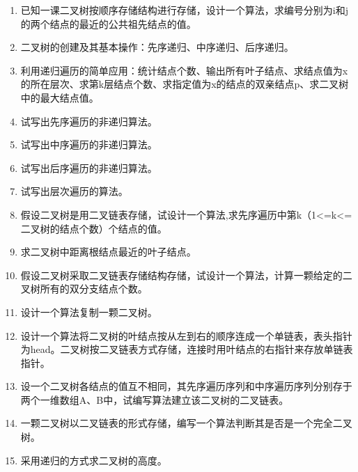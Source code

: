 \documentclass[lang=cn,newtx,10pt,scheme=chinese]{../../elegantbook}
\begin{document}
\begin{enumerate}
\def\labelenumi{\arabic{enumi}.}
\item
  已知一课二叉树按顺序存储结构进行存储，设计一个算法，求编号分别为i和j的两个结点的最近的公共祖先结点的值。
\vspace{5cm}
\item
  二叉树的创建及其基本操作：先序递归、中序递归、后序递归。
\vspace{5cm}
\item
  利用递归遍历的简单应用：统计结点个数、输出所有叶子结点、求结点值为x的所在层次、求第k层结点个数、求指定值为x的结点的双亲结点p、求二叉树中的最大结点值。
\vspace{5cm}
\item
  试写出先序遍历的非递归算法。
\vspace{5cm}
\item
  试写出中序遍历的非递归算法。
\vspace{5cm}
\item
  试写出后序遍历的非递归算法。
\vspace{5cm}
\item
  试写出层次遍历的算法。
\vspace{5cm}
\item
  假设二叉树是用二叉链表存储，试设计一个算法,求先序遍历中第k（1\textless=k\textless=二叉树的结点个数）个结点的值。
\vspace{5cm}
\item
  求二叉树中距离根结点最近的叶子结点。
\vspace{5cm}
\item
  假设二叉树采取二叉链表存储结构存储，试设计一个算法，计算一颗给定的二叉树所有的双分支结点个数。
\vspace{5cm}
\item
  设计一个算法复制一颗二叉树。
\vspace{5cm}
\item
  设计一个算法将二叉树的叶结点按从左到右的顺序连成一个单链表，表头指针为head。二叉树按二叉链表方式存储，连接时用叶结点的右指针来存放单链表指针。
\vspace{5cm}
\item
  设一个二叉树各结点的值互不相同，其先序遍历序列和中序遍历序列分别存于两个一维数组A、B中，试编写算法建立该二叉树的二叉链表。
\vspace{5cm}
\item
  一颗二叉树以二叉链表的形式存储，编写一个算法判断其是否是一个完全二叉树。
\vspace{5cm}
\item
  采用递归的方式求二叉树的高度。

\end{enumerate}
\end{document}
